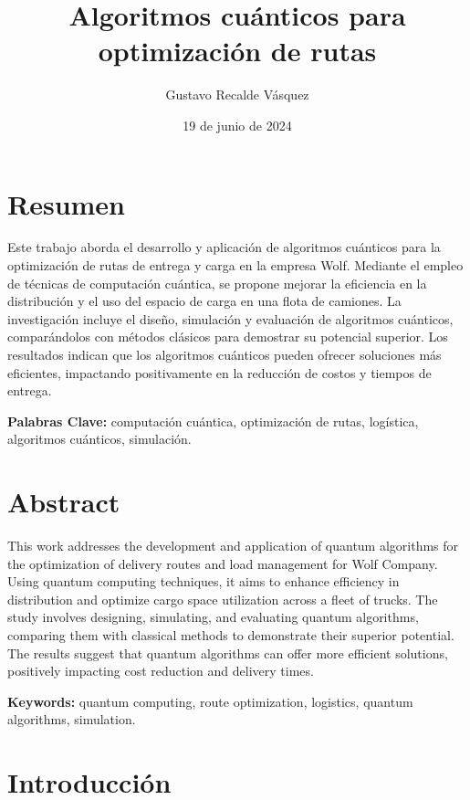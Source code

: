 \documentclass[11pt,a4paper,spanish]{book}
\title{ Algoritmos cuánticos para optimización de rutas}
\author{ Gustavo Recalde Vásquez}
\date{ 19 de junio de 2024}
\begin{document}
\renewcommand{\listfigurename}{Índice de Ilustraciones}
\renewcommand{\listtablename}{Índice de Tablas}
\renewcommand{\contentsname}{Índice de Contenidos}
\renewcommand{\figurename}{Figura}
\renewcommand{\tablename}{Tabla} 

\maketitle
\frontmatter
\tableofcontents
\listoffigures
\listoftables

\chapter{Resumen}

Este trabajo aborda el desarrollo y aplicación de algoritmos cuánticos para la optimización de rutas de entrega y carga en la empresa Wolf. Mediante el empleo de técnicas de computación cuántica, se propone mejorar la eficiencia en la distribución y el uso del espacio de carga en una flota de camiones. La investigación incluye el diseño, simulación y evaluación de algoritmos cuánticos, comparándolos con métodos clásicos para demostrar su potencial superior. Los resultados indican que los algoritmos cuánticos pueden ofrecer soluciones más eficientes, impactando positivamente en la reducción de costos y tiempos de entrega.

{\bf Palabras Clave:} computación cuántica, optimización de rutas, logística, algoritmos cuánticos, simulación.


\chapter{Abstract}

This work addresses the development and application of quantum algorithms for the optimization of delivery routes and load management for Wolf Company. Using quantum computing techniques, it aims to enhance efficiency in distribution and optimize cargo space utilization across a fleet of trucks. The study involves designing, simulating, and evaluating quantum algorithms, comparing them with classical methods to demonstrate their superior potential. The results suggest that quantum algorithms can offer more efficient solutions, positively impacting cost reduction and delivery times.

{\bf Keywords:} quantum computing, route optimization, logistics, quantum algorithms, simulation.

\mainmatter
\chapter{Introducción}
\end{document}
